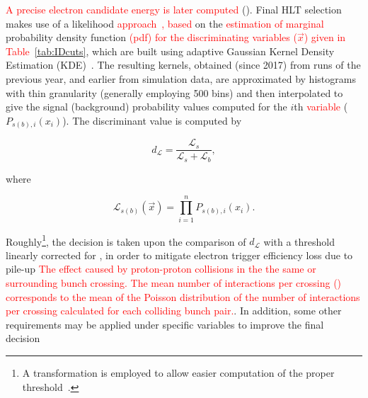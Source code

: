   
  


\textcolor{red}{A precise electron candidate energy is later computed} (\hltcalo). Final HLT selection makes use of a likelihood
\textcolor{red}{approach~\cite{ATL-COM-PHYS-2017-1012,ATLAS-PERF-2017-01-002}, based} on the \textcolor{red}{estimation of marginal} probability density function \textcolor{red}{(pdf) for the discriminating variables ($\vec{x}$) given in Table~\ref{tab:IDcuts}}, which are built using adaptive Gaussian Kernel Density Estimation (KDE)~\cite{Silverman2018,TMVA}. The
resulting kernels, obtained (since 2017) from runs of the previous year, and
earlier from simulation data, are approximated by histograms with thin
granularity (generally employing 500 bins) and then interpolated to give the
signal (background) probability values computed for the $i$th \textcolor{red}{variable}
($P_{s(b),i}(x_i)$). The discriminant value is computed by

\begin{equation}
  d_{\mathcal{L}} = \frac{\mathcal{L}_{s}}{\mathcal{L}_{s} + \mathcal{L}_{b}},
\end{equation}
  
\noindent where
  
\begin{equation}
\mathcal{L}_{s(b)}(\vec{x}) = \prod_{i=1}^{n} P_{s(b),i}(x_i).
\label{eq:likelihoods}
\end{equation}



\noindent Roughly\footnote{A transformation is employed to allow
easier computation of the proper threshold~\cite{aaboud2019electron}.},
the decision is taken upon the comparison of $d_{\mathcal{L}}$ with a
threshold linearly corrected for \avgmu{}, in order to mitigate electron trigger
efficiency loss due to pile-up \textcolor{red}{The effect caused by proton-proton collisions in the the same or surrounding bunch crossing. The mean number of interactions per crossing (\avgmu{}) corresponds to the
mean of the Poisson distribution of the number of interactions per crossing calculated for each colliding bunch pair.}. In addition, some other requirements may be
applied under specific variables to improve the final
decision~\cite{aaboud2019electron}

